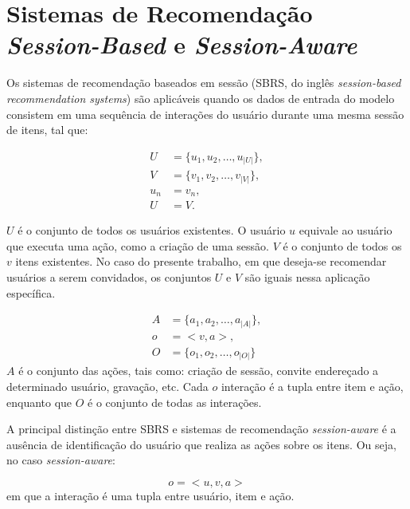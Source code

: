 \section{Sistemas de Recomendação \textit{Session-Based} e \textit{Session-Aware}}

Os sistemas de recomendação baseados em sessão (SBRS, do inglês
 \textit{session-based recommendation systems}) são aplicáveis quando os dados
 de entrada do modelo consistem em uma sequência de interações do usuário
 durante uma mesma sessão de itens, tal que\cite{survey_wang_2021}:

 \begin{equation*}
  \begin{aligned}
  U & = \{u_1, u_2, \ldots, u_{|U|}\}, \\
  V & = \{v_1, v_2, \ldots, v_{|V|}\}, \\
  u_n & = v_n, \\
  U & = V.
\end{aligned}
\end{equation*}

$U$ é o conjunto de todos os usuários existentes. O usuário $u$ equivale ao
usuário que executa uma ação, como a criação de uma sessão. $V$ é o conjunto de
todos os $v$ itens existentes. No caso do presente trabalho, em que deseja-se
recomendar usuários a serem convidados, os conjuntos $U$ e $V$ são iguais nessa
aplicação específica.

\begin{equation*}
  \begin{aligned}
  A & = \{a_1, a_2, \ldots, a_{|A|}\}, \\
  o & = <v, a>, \\
  O & = \{o_1, o_2, \ldots, o_{|O|}\}
  \end{aligned}
  \end{equation*}
$A$ é o conjunto das ações, tais como: criação de sessão, convite endereçado a
  determinado usuário, gravação, etc. Cada $o$ interação é a tupla entre item e
  ação, enquanto que $O$ é o conjunto de todas as interações.

  A principal distinção entre SBRS e sistemas de recomendação \textit{session-aware}
  é a ausência de identificação do usuário que realiza as ações sobre os itens.
  Ou seja, no caso \textit{session-aware}:

  \begin{equation}
    o = <u, v, a>
    \end{equation}
  em que a interação é uma tupla entre usuário, item e ação.

